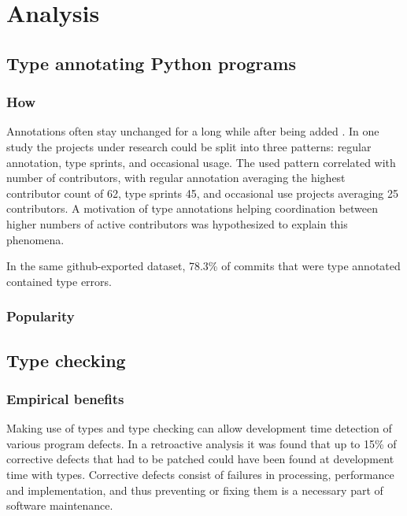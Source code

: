 \chapter{Analysis\label{analysis}}

\section{Type annotating Python programs}


\subsection{How}
Annotations often stay unchanged for a long while after being added \cite{di_grazia_evolution_2022}. In one study the projects under research  could be split into three patterns: regular annotation, type sprints, and occasional usage. The used pattern correlated with number of contributors, with regular annotation averaging the highest contributor count of 62, type sprints 45, and occasional use projects averaging 25 contributors. A motivation of type annotations helping coordination between higher numbers of active contributors was hypothesized to explain this phenomena.

In the same github-exported dataset, 78.3\% of commits that were type annotated contained type errors\cite{di_grazia_evolution_2022}.


\subsection{Popularity}


\section{Type checking}

\subsection{Empirical benefits}

Making use of types and type checking can allow development time detection of various program defects. In a retroactive analysis it was found that up to 15\% of corrective defects that had to be patched could have been found at development time with types\cite{khan_empirical_2022}. Corrective defects consist of failures in processing, performance and implementation, and thus preventing or fixing them is a necessary part of software maintenance.

